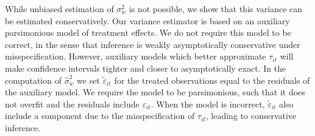 \documentclass[english,11pt]{article}
\theoremstyle{plain}
\theoremstyle{plain}
\theoremstyle{plain}
\theoremstyle{plain}
\begin{document}
While unbiased estimation of $\sigma_{w}^{2}$ is not possible, we
show that this variance can be estimated conservatively. Our variance
estimator is based on an auxiliary parsimonious model of treatment
effects. We do not require this model to be correct, in the sense
that inference is weakly asymptotically conservative under misspecification.
However, auxiliary models which better approximate $\tau_{it}$ will
make confidence intervals tighter and closer to asymptotically exact.
In the computation of $\hat{\sigma}_{w}^{2}$ we set $\tilde{\varepsilon}_{it}$
for the treated observations equal to the residuals of the auxiliary
model. We require the model to be parsimonious, such that it does
not overfit and the residuals include $\varepsilon_{it}$. When the
model is incorrect, $\tilde{\varepsilon}_{it}$ also include a component
due to the misspecification of $\tau_{it}$, leading to conservative
inference.
\end{document}
